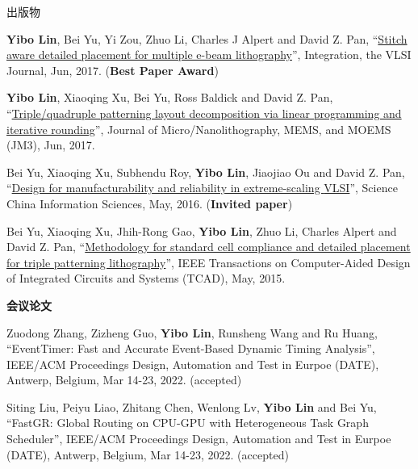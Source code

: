 \begin{rSection}{出版物}
\begin{description}[font=\normalfont]
{}
            

\item[{[J4]}]{
        \textbf{Yibo Lin}, Bei Yu, Yi Zou, Zhuo Li, Charles J Alpert and David Z. Pan, 
    ``\href{http://dx.doi.org/10.1016/j.vlsi.2017.02.004}{Stitch aware detailed placement for multiple e-beam lithography}'', 
    Integration, the VLSI Journal, Jun, 2017.
    (\textbf{Best Paper Award})
}
            

\item[{[J3]}]{
        \textbf{Yibo Lin}, Xiaoqing Xu, Bei Yu, Ross Baldick and David Z. Pan, 
    ``\href{http://dx.doi.org/10.1117/1.JMM.16.2.023507}{Triple/quadruple patterning layout decomposition via linear programming and iterative rounding}'', 
    Journal of Micro/Nanolithography, MEMS, and MOEMS (JM3), Jun, 2017.
    
}
            

\item[{[J2]}]{
        Bei Yu, Xiaoqing Xu, Subhendu Roy, \textbf{Yibo Lin}, Jiaojiao Ou and David Z. Pan, 
    ``\href{http://link.springer.com/article/10.1007%2Fs11432-016-5560-6}{Design for manufacturability and reliability in extreme-scaling {VLSI}}'', 
    Science China Information Sciences, May, 2016.
    (\textbf{Invited paper})
}
            

\item[{[J1]}]{
        Bei Yu, Xiaoqing Xu, Jhih-Rong Gao, \textbf{Yibo Lin}, Zhuo Li, Charles Alpert and David Z. Pan, 
    ``\href{https://doi.org/10.1109/TCAD.2015.2401571}{Methodology for standard cell compliance and detailed placement for triple patterning lithography}'', 
    IEEE Transactions on Computer-Aided Design of Integrated Circuits and Systems (TCAD), May, 2015.
    
}
            

\end{description}
    

\textbf{会议论文}
        

\begin{description}[font=\normalfont]
    

\item[{[C60]}]{
        Zuodong Zhang, Zizheng Guo, \textbf{Yibo Lin}, Runsheng Wang and Ru Huang, 
    ``EventTimer: Fast and Accurate Event-Based Dynamic Timing Analysis'', 
    IEEE/ACM Proceedings Design, Automation and Test in Eurpoe (DATE), Antwerp, Belgium, Mar 14-23, 2022.
    (accepted)
}
            

\item[{[C59]}]{
        Siting Liu, Peiyu Liao, Zhitang Chen, Wenlong Lv, \textbf{Yibo Lin} and Bei Yu, 
    ``FastGR: Global Routing on CPU-GPU with Heterogeneous Task Graph Scheduler'', 
    IEEE/ACM Proceedings Design, Automation and Test in Eurpoe (DATE), Antwerp, Belgium, Mar 14-23, 2022.
    (accepted)
}
            


\end{description}
\end{rSection}
